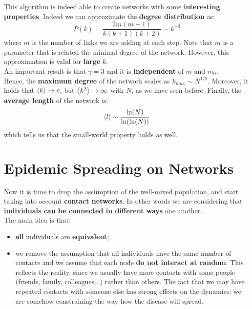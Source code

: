 \documentclass[../main/main.tex]{subfiles}
\begin{document}
This algorithm is indeed able to create networks with some \textbf{interesting properties}. Indeed we can approximate the \textbf{degree distribution} as:
\begin{equation*}
  P(k) = \frac{2 m (m +1)}{k(k+1)(k+2)} \sim k^{-3}
\end{equation*}
where $m$ is the number of links we are adding at each step. Note that $m$ is a parameter that is related the minimal degree of the network. However, this approximation is valid for \textbf{large} \( k \).\\
An important result is that \( \gamma =3  \) and it is \textbf{independent} of \( m \) and \( m_0 \).\\
Hence, the \textbf{maximum degree} of the network scales as \( k_{max} \sim N^{1/2} \). Moreover, it holds that \( \expval{k} \rightarrow c \), but \( \expval{k^2} \rightarrow \infty   \) with \( N \), as we have seen before.
Finally, the \textbf{average length} of the network is:
\begin{equation*}
  \expval{l} \sim \frac{\ln (N)}{\ln (\ln (N))}
\end{equation*}
which tells us that the small-world property holds as well.










\chapter{Epidemic Spreading on Networks}

Now it is time to drop the assumption of the well-mixed population, and start taking into account \textbf{contact networks}. In other words we are considering that \textbf{individuals can be connected in different ways} one another.\\
The main idea is that:
\begin{itemize}
\item \textbf{all} individuals are \textbf{equivalent};
\item we remove the assumption that all individuals have the same number of contacts and we assume that each node \textbf{do not interact at random}. This reflects the reality, since we usually have more contacts with some people (friends, family, colleagues...) rather than others. The fact that we may have repeated contacts with someone else has strong effects on the dynamics: we are somehow constraining the way how the disease will spread.
\end{itemize}
\end{document}

